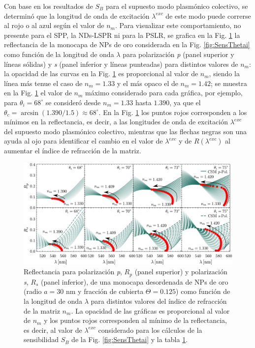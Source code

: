 Con base en los resultados de $S_B$ para el supuesto modo  plasmónico colectivo, se determinó que la longitud de onda de excitación $\lambda^{exc}$ de este modo puede correrse al rojo o al azul según el valor de $n_m$. Para visualizar este comportamiento, no presente para el SPP, la NDs-LSPR ni para la PSLR, se grafica en la Fig. \ref{fig:SensRpRs} la reflectancia de la monocapa de NPs de oro considerada en la Fig. \ref{fig:SensThetai} como función de la longitud de onda $\lambda$ para polarización \emph{p} (panel superior y líneas sólidas) y \emph{s} (panel inferior y líneas punteadas) para distintos valores de $n_m$: la opacidad de las curvas en la Fig. \ref{fig:SensRpRs} es proporcional al valor de $n_m$, siendo la línea más tenue el caso de $n_m=1.33$ y el más opaco el de $n_m=1.42$; se muestra en la Fig. \ref{fig:SensRpRs} el valor de $n_m$ máximo considerado para cada gráfica, por ejemplo, para $\theta_i=68^\circ$ se consideró desde $n_m=1.33$ hasta $1.390$, ya que el $\theta_c=\arcsin(1.390/1.5)\approx 68^\circ$. En la Fig. \ref{fig:SensRpRs} los puntos rojos corresponden a los mínimos en la reflectancia, es decir, a las longitudes de onda de excitación $\lambda^{exc}$ del supuesto modo plasmónico colectivo, mientras que las flechas negras son una ayuda al ojo para identificar el cambio en el valor de $\lambda^{exc}$ y de $R(\lambda^{exc})$ al aumentar el índice de refracción de la matriz.

\begin{figure}[h!]\centering
	\includegraphics[width=1\linewidth]{2-Resultados/figs/11-SPPCSM/2-RpRs}\vspace*{-.7em}%
\caption{Reflectancia para polarización \emph{p}, $R_p$ (panel superior) y polarización \emph{s}, $R_s$ (panel inferior), de una monocapa desordenada de NPs de oro (radio $a=30$ nm y fracción de cubierta $\Theta=0.125$)  como función de la longitud de onda $\lambda$ para distintos valores del  índice de refracción de la matriz $n_m$. La opacidad de las gráficas es proporcional al valor de $n_m$  y los puntos rojos corresponden al mínimo de la reflectancia, es decir, al valor de $\lambda^{exc}$ considerado para los cálculos de la sensibilidad $S_B$ de la Fig. \ref{fig:SensThetai} y la tabla \ref{fig:SensRpRs}.	
	}\label{fig:SensRpRs}
	\end{figure}	

